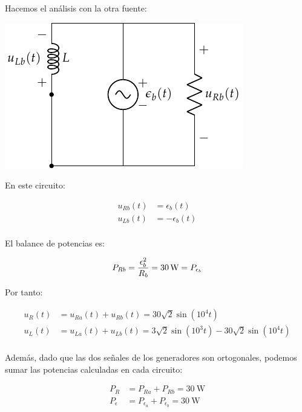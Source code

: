 Hacemos el análisis con la otra fuente:

\begin{center}
\includegraphics{figuras/superposicion2_B}
\end{center}

En este circuito:

\begin{align*}
  u_{Rb}(t) &= \epsilon_b(t)\\
  u_{Lb}(t) &= -\epsilon_b(t)\\  
\end{align*}

El balance de potencias es:

\begin{equation*}
  P_{Rb} = \frac{\epsilon_b^2}{R_b} = \qty{30}{\watt} = P_{\epsilon_b}\\
\end{equation*}

Por tanto:

\begin{align*}
  u_R(t) &= u_{Ra}(t) + u_{Rb}(t) = 30\sqrt{2}\sin(10^4 t)\\
  u_L(t) &= u_{La}(t) + u_{Lb}(t) = 3\sqrt{2}\sin(10^3 t) - 30\sqrt{2}\sin(10^4 t)\\
\end{align*}

Además, dado que las dos señales de los generadores son ortogonales, podemos sumar las potencias calculadas en cada circuito:

\begin{align*}
  P_R &= P_{Ra} + P_{Rb} = \qty{30}{\watt}\\
  P_\epsilon &= P_{\epsilon_a} + P_{\epsilon_b} = \qty{30}{\watt}\\
\end{align*}


